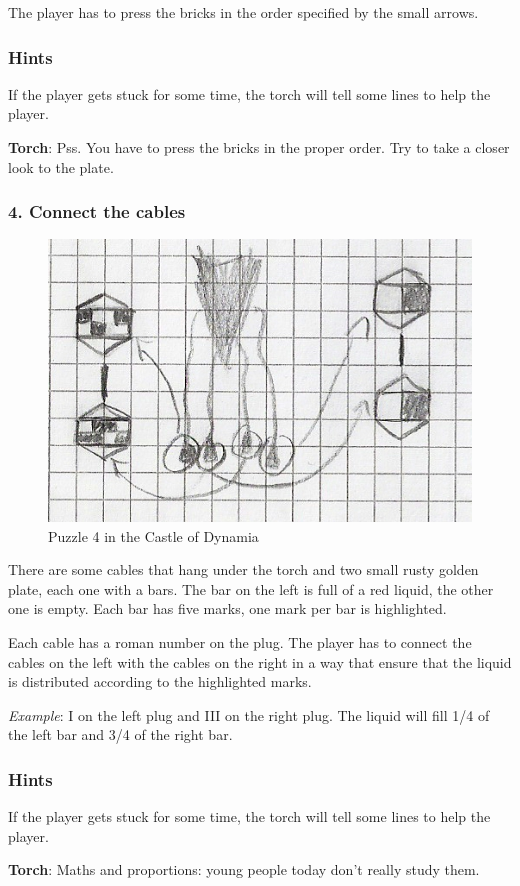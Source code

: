 The player has to press the bricks in the order specified by the small arrows.

\subsubsection*{Hints}
If the player gets stuck for some time, the torch will tell some lines to help the player.

\textbf{Torch}: Pss. You have to press the bricks in the proper order. Try to take a closer look to the plate.

\subsubsection{4. Connect the cables}

\begin{figure}[H]
  \centering
  \includegraphics[width=\textwidth]{Images/Puzzles/castleOfDynamia_4}
  \caption{Puzzle 4 in the Castle of Dynamia}
\end{figure}


There are some cables that hang under the torch and two small rusty golden plate, each one with a bars. The bar on the left is full of a red liquid, the other one is empty. Each bar has five marks, one mark per bar is highlighted.

Each cable has a roman number on the plug. The player has to connect the cables on the left with the cables on the right in a way that ensure that the liquid is distributed according to the highlighted marks.

\textit{Example}: I on the left plug and III on the right plug. The liquid will fill 1/4 of the left bar and 3/4 of the right bar.

\subsubsection*{Hints}
If the player gets stuck for some time, the torch will tell some lines to help the player.

\textbf{Torch}: Maths and proportions: young people today don't really study them.

